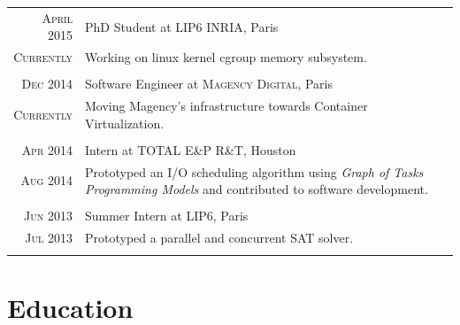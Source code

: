 \documentclass[a4paper,10pt]{article} %
\begin{document}
\begin{tabular}{r|p{11cm}}

\textsc{April 2015} & PhD Student at \textsc{LIP6 INRIA}, Paris\\
\textsc{Currently} & \footnotesize{
						Working on linux kernel cgroup memory subsystem.
					}\\
\multicolumn{2}{c}{} \\


\textsc{Dec 2014} & Software Engineer at \textsc{Magency Digital}, Paris\\
\textsc{Currently} & \footnotesize{
						Moving Magency's infrastructure towards Container Virtualization.
					}\\
\multicolumn{2}{c}{} \\


\textsc{Apr 2014} & Intern at \textsc{TOTAL E\&P R\&T}, Houston\\
\textsc{Aug 2014} & \footnotesize{
						Prototyped an I/O scheduling algorithm using \emph{Graph of Tasks Programming Models} and contributed to software development.
					}\\
\multicolumn{2}{c}{} \\


\textsc{Jun 2013} & Summer Intern at \textsc{LIP6}, Paris\\
\textsc{Jul 2013} & \footnotesize{
						Prototyped a parallel and concurrent SAT solver.
					}\\
\multicolumn{2}{c}{} \\

\end{tabular}


\section{Education}
\end{document}
